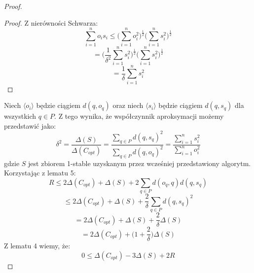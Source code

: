 \begin{proof}
\begin{lemma}{\cite{10.1145/1007352.1007400}}
    \end{lemma}
    \begin{proof}
        Z nierówności Schwarza:
        \begin{equation}
            \sum_{i=1}^{n} o_{i} s_{i} \leq \Big( \sum_{i=1}^{n} o_{i}^{2} \Big)^{\frac{1}{2}} \Big( \sum_{i=1}^{n} s_{i}^{2} \Big)^{\frac{1}{2}}
        \end{equation}
        \begin{equation}
            = \Big( \frac{1}{\delta^{2}}\sum_{i=1}^{n} s_{i}^{2} \Big)^{\frac{1}{2}} \Big( \sum_{i=1}^{n} s_{i}^{2} \Big)^{\frac{1}{2}}
        \end{equation}
        \begin{equation}
            = \frac{1}{\delta} \sum_{i=1}^{n} s_{i}^{2}
        \end{equation}
    \end{proof}
    Niech $\langle o_{i} \rangle$ będzie ciągiem $d(q, o_{q})$ oraz niech $\langle s_{i} \rangle$ będzie ciągiem $d(q,s_{q})$ dla wszystkich $q \in P$.
    Z tego wynika, że współczynnik aproksymacji możemy przedstawić jako:
    \begin{equation}
        \delta^{2} = \frac{\Delta(S)}{\Delta(C_{opt})} = \frac{\sum_{q \in P} d(q,s_{q})^{2}}{\sum_{q \in P} d(q,o_{q})^{2}} =\frac{\sum_{i=1}^{n} s_{i}^{2}}{\sum_{i=1}^{n} o_{i}^{2}}
    \end{equation}
    gdzie $S$ jest zbiorem 1-stable uzyskanym przez wcześniej przedstawiony algorytm.
    Korzystając z lematu 5:
    \begin{equation}
        R \leq 2\Delta(C_{opt}) + \Delta(S) + 2\sum_{q \in P} d(o_{q}, q)d(q, s_{q}) 
    \end{equation}
    \begin{equation}
        \leq 2\Delta(C_{opt}) + \Delta(S) + \frac{2}{\delta}\sum_{q \in P} d(q, s_{q})^{2} 
    \end{equation}
    \begin{equation}
        = 2\Delta(C_{opt}) + \Delta(S) + \frac{2}{\delta}\Delta(S)
    \end{equation}
    \begin{equation}
        = 2\Delta(C_{opt}) + \Big(1 + \frac{2}{\delta} \Big)\Delta(S)
    \end{equation}
    Z lematu 4 wiemy, że:
    \begin{equation}
        0 \leq \Delta(C_{opt}) - 3\Delta(S) + 2R
    \end{equation}
    \begin{equation}

\end{equation}
\end{proof}
